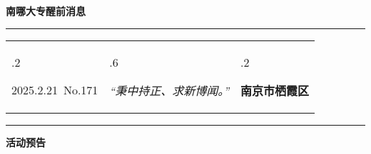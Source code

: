 \documentclass[letterpaper, 12pt]{article}
\begin{document}
\begin{center}
    \Huge\textbf{南哪大专醒前消息}
\end{center}
\vspace{4mm}
\hrule
\renewcommand\tabularxcolumn[1]{m{#1}}
\begin{tabularx}{\textwidth}{>{\hsize.2\hsize}X>{\hsize.6\hsize}X>{\hsize.2\hsize}X}
    \begin{flushleft}
        2025.2.21\, No.171
    \end{flushleft}
    &
    \begin{center}
        \textit{“秉中持正、求新博闻。”}
    \end{center}
    &
    \begin{flushright}
        \textbf{南京市栖霞区}
    \end{flushright}
\end{tabularx}
\vspace{-3.5mm}
\hrule
\vspace{4mm}
\centerline{\huge\textbf{活动预告}}
\end{document}
